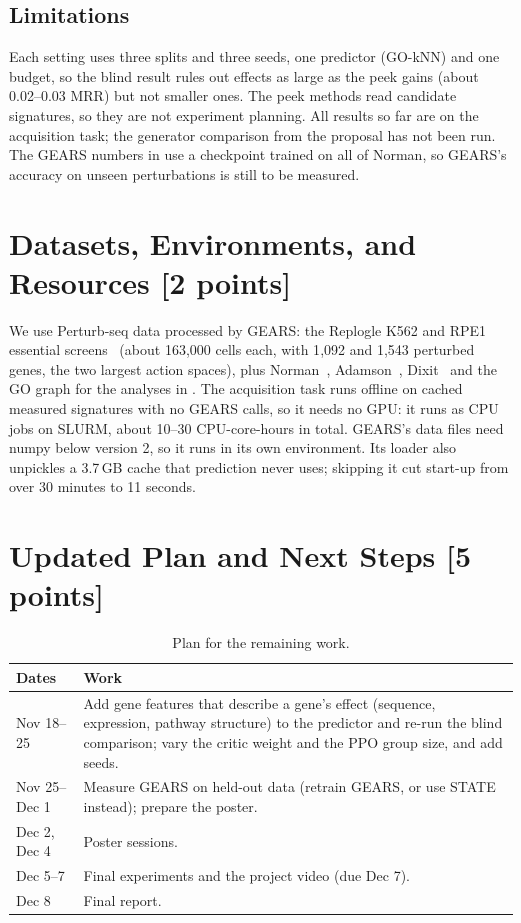 \documentclass[11pt, letterpaper]{cmu}
\let\Cref\crtCref
\begin{document}
\subsection{Limitations}

Each setting uses three splits and three seeds, one predictor (GO-kNN) and one budget, so the
blind result rules out effects as large as the peek gains (about 0.02--0.03 MRR) but not smaller
ones. The peek methods read candidate signatures, so they are not experiment planning. All
results so far are on the acquisition task; the generator comparison from the proposal has not
been run. The GEARS numbers in \Cref{sec:oracle} use a checkpoint trained on all of Norman, so
GEARS's accuracy on unseen perturbations is still to be measured.

\section{Datasets, Environments, and Resources [2 points]}

We use Perturb-seq data processed by GEARS: the Replogle K562 and RPE1 essential
screens~\citep{replogle2022perturbseq} (about 163{,}000 cells each, with 1{,}092 and 1{,}543
perturbed genes, the two largest action spaces), plus Norman~\citep{norman2019gi},
Adamson~\citep{adamson2016upr}, Dixit~\citep{dixit2016perturbseq} and the GO graph for the
analyses in \Cref{sec:oracle}. The acquisition task runs offline on cached measured signatures
with no GEARS calls, so it needs no GPU: it runs as CPU jobs on SLURM, about 10--30 CPU-core-hours
in total. GEARS's data files need numpy below version 2, so it runs in its own environment. Its loader
also unpickles a 3.7\,GB cache that prediction never uses; skipping it cut start-up from over
30 minutes to 11 seconds.

\section{Updated Plan and Next Steps [5 points]}

\begin{table}[htb]
\centering
\begin{tabularx}{\linewidth}{lX}
\toprule
Dates & Work \\
\midrule
Nov 18--25 & Add gene features that describe a gene's effect (sequence, expression, pathway
structure) to the predictor and re-run the blind comparison; vary the critic weight and the
PPO group size, and add seeds. \\
Nov 25--Dec 1 & Measure GEARS on held-out data (retrain GEARS, or use
STATE~\citep{arcstate2026} instead); prepare the poster. \\
Dec 2, Dec 4 & Poster sessions. \\
Dec 5--7 & Final experiments and the project video (due Dec 7). \\
Dec 8 & Final report. \\
\bottomrule
\end{tabularx}
\caption{Plan for the remaining work.}
\label{tab:timeline}
\end{table}
\end{document}
